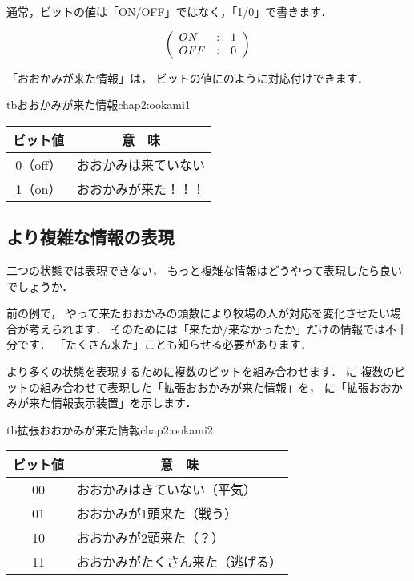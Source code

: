 \begin{center}
\end{center}

通常，ビットの値は「ON/OFF」ではなく，「1/0」で書きます．

{\small\[\left(\begin{array}{l c l}
ON  & : & 1 \\
OFF & : & 0
\end{array}\right)\]}

「おおかみが来た情報」は，
ビットの値にのように対応付けできます．

\begin{mytable}{tb}{おおかみが来た情報}{chap2:ookami1}
{\small\begin{tabular}{c|l} \hline\hline
ビット値 & \multicolumn{1}{c}{意　味} \\
\hline
0（off） & おおかみは来ていない \\
1（on）  & おおかみが来た！！！ \\
\end{tabular}}
\end{mytable}

\subsection{より複雑な情報の表現}

二つの状態では表現できない，
もっと複雑な情報はどうやって表現したら良いでしょうか．

前の例で，
やって来たおおかみの頭数により牧場の人が対応を変化させたい場合が考えられます．
そのためには「来たか/来なかったか」だけの情報では不十分です．
「たくさん来た」ことも知らせる必要があります．

より多くの状態を表現するために複数のビットを組み合わせます．
に
複数のビットの組み合わせて表現した「拡張おおかみが来た情報」を，
に「拡張おおかみが来た情報表示装置」を示します．

\begin{mytable}{tb}{拡張おおかみが来た情報}{chap2:ookami2}
{\small\begin{tabular}{c|l} \hline\hline
ビット値 & \multicolumn{1}{c}{意　味}  \\
\hline
00 & おおかみはきていない（平気）      \\
01 & おおかみが1頭来た（戦う）         \\
10 & おおかみが2頭来た（？）           \\
11 & おおかみがたくさん来た（逃げる）  \\
\end{tabular}}
\end{mytable}


